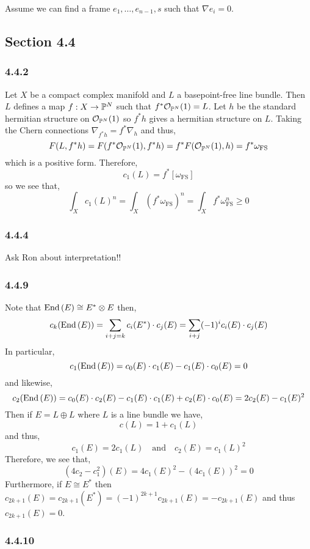 \documentclass[12pt]{article}
\begin{document}
  Assume we can find a frame $e_1, \dots, e_{n-1}, s$ such that $\nabla e_i = 0$. 

\subsection{Section 4.4}

\subsubsection{4.4.2}

Let $X$ be a compact complex manifold and $L$ a basepoint-free line bundle. Then $L$ defines a map $f : X \to \P^N$ such that $f^* \struct{\P^N}(1) = L$. Let $h$ be the standard hermitian structure on $\struct{\P^N}(1)$ so $f^* h$ gives a hermitian structure on $L$. Taking the Chern connections $\nabla_{f^* h} = f^* \nabla_h$ and thus,
\[ F(L, f^* h) = F(f^* \struct{\P^N}(1), f^* h) = f^* F(\struct{\P^N}(1), h) = f^* \omega_{\text{FS}} \]
which is a positive form.
Therefore,
\[ c_1(L) = f^* [\omega_{\text{FS}}] \] so we see that,
\[ \int_{X} c_1(L)^{n} = \int_X (f^* \omega_{\text{FS}})^{n} = \int_X f^* \omega_{\text{FS}}^n \ge 0 \]

\subsubsection{4.4.4}

Ask Ron about interpretation!!

\subsubsection{4.4.9}

Note that $\End{E} \cong E^* \otimes E$ then,
\[ c_k(\End{E}) = \sum_{i + j = k} c_i(E^*) \cdot c_j(E) = \sum_{i + j} (-1)^i c_i(E) \cdot c_j(E) \]
In particular,
\[ c_1(\End{E}) = c_0(E) \cdot c_1(E) - c_1(E) \cdot c_0(E) = 0 \]
and likewise,
\[ c_2(\End{E}) = c_0(E) \cdot c_2(E) - c_1(E) \cdot c_1(E) + c_2(E) \cdot c_0(E) = 2 c_2(E) - c_1(E)^2 \]
Then if $E = L \oplus L$ where $L$ is a line bundle we have,
\[ c(L) = 1 + c_1(L) \]
and thus,
\[ c_1(E) = 2 c_1(L) \quad \text{and} \quad c_2(E) = c_1(L)^2 \]
Therefore, we see that,
\[ (4 c_2 - c_1^2)(E) = 4 c_1(E)^2 - (4 c_1(E))^2 = 0 \]
Furthermore, if $E \cong E^*$ then $c_{2k+1}(E) = c_{2k+1}(E^*) = (-1)^{2k + 1} c_{2k+1}(E) = - c_{2k + 1}(E)$ and thus $c_{2k + 1}(E) = 0$.

\subsubsection{4.4.10}
\end{document}
